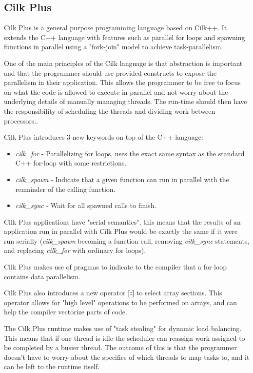 \subsection{Cilk Plus}

Cilk Plus is a general purpose programming language based on Cilk++\cite{cilk++}. It extends the C++ language with features such as
parallel for loops and spawning functions in parallel using a "fork-join" model to achieve task-parallelism.

One of the main principles of the Cilk language is that abstraction is important and that the programmer should use provided constructs to expose 
the parallelism in their application. This allows the programmer to be free to focus on what the code is allowed to execute in parallel and not worry about the underlying details of manually managing threads. The run-time should then have the responsibility of scheduling the threads and dividing work between
processors.\cite{cilkfaq}. 

Cilk Plus introduces 3 new keywords on top of the C++ language\cite{cilk}: 
\begin{itemize}
    \item \textit{cilk\_for} - Parallelizing for loops, uses the exact same syntax as the standard C++ for-loop
                             with some restrictions.
    \item \textit{cilk\_spawn} - Indicate that a given function can run in parallel with the remainder
                              of the calling function. 
    \item \textit{cilk\_sync} - Wait for all spawned calls to finish.
\end{itemize}

Cilk Plus applications have "serial semantics"\cite{cilk}, this means that the results of an application run
in parallel with Cilk Plus would be exactly the same if it were run
serially (\textit{cilk\_spawn} becoming a function call, removing \textit{cilk\_sync} statements, 
and replacing \textit{cilk\_for} with ordinary for loops).

Cilk Plus makes use of pragmas to indicate to the compiler that a for loop contains data parallelism.\cite{cilkfaq}

Cilk Plus also introduces a new operator \textbf{[:]} to select array sections\cite{cilkarray}. This operator
allows for "high level" operations to be performed on arrays, and can help the compiler vectorize parts of code.

The Cilk Plus runtime makes use of "task stealing" for dynamic load balancing\cite{cilkfaq}. This 
means that if one thread is idle the scheduler can reassign work assigned to be completed by a busier thread. 
The outcome of this is that the programmer doesn't have to worry about the specifics of which threads
to map tasks to, and it can be left to the runtime itself.


